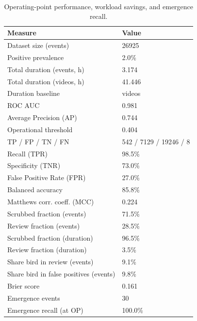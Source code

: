 \begin{table}
\caption{Operating-point performance, workload savings, and emergence recall.}
\label{tab:summary}
\begin{tabular}{ll}
\toprule
Measure & Value \\
\midrule
Dataset size (events) & 26925 \\
Positive prevalence & 2.0\% \\
Total duration (events, h) & 3.174 \\
Total duration (videos, h) & 41.446 \\
Duration baseline & videos \\
ROC AUC & 0.981 \\
Average Precision (AP) & 0.744 \\
Operational threshold & 0.404 \\
TP / FP / TN / FN & 542 / 7129 / 19246 / 8 \\
Recall (TPR) & 98.5\% \\
Specificity (TNR) & 73.0\% \\
False Positive Rate (FPR) & 27.0\% \\
Balanced accuracy & 85.8\% \\
Matthews corr. coeff. (MCC) & 0.224 \\
Scrubbed fraction (events) & 71.5\% \\
Review fraction (events) & 28.5\% \\
Scrubbed fraction (duration) & 96.5\% \\
Review fraction (duration) & 3.5\% \\
Share bird in review (events) & 9.1\% \\
Share bird in false positives (events) & 9.8\% \\
Brier score & 0.161 \\
Emergence events & 30 \\
Emergence recall (at OP) & 100.0\% \\
\bottomrule
\end{tabular}
\end{table}
